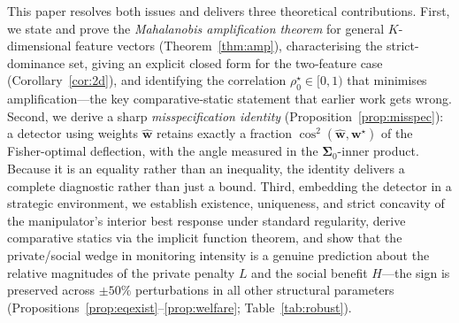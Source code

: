 \documentclass[11pt,a4paper]{article}
\theoremstyle{definition}
\theoremstyle{remark}
\newcommand{\1}{\mathbf{1}}
\newcommand{\w}{\mathbf{w}}
\newcommand{\Sig}{\boldsymbol{\Sigma}}
\begin{document}
This paper resolves both issues and delivers three theoretical contributions. First, we state and prove the \emph{Mahalanobis amplification theorem} for general $K$-dimensional feature vectors (Theorem~\ref{thm:amp}), characterising the strict-dominance set, giving an explicit closed form for the two-feature case (Corollary~\ref{cor:2d}), and identifying the correlation $\rho_0^\star\in[0,1)$ that minimises amplification---the key comparative-static statement that earlier work gets wrong. Second, we derive a sharp \emph{misspecification identity} (Proposition~\ref{prop:misspec}): a detector using weights $\widehat{\w}$ retains exactly a fraction $\cos^2(\widehat{\w},\w^\star)$ of the Fisher-optimal deflection, with the angle measured in the $\Sig_0$-inner product. Because it is an equality rather than an inequality, the identity delivers a complete diagnostic rather than just a bound. Third, embedding the detector in a strategic environment, we establish existence, uniqueness, and strict concavity of the manipulator's interior best response under standard regularity, derive comparative statics via the implicit function theorem, and show that the private/social wedge in monitoring intensity is a genuine prediction about the relative magnitudes of the private penalty $L$ and the social benefit $H$---the sign is preserved across $\pm 50\%$ perturbations in all other structural parameters (Propositions~\ref{prop:eqexist}--\ref{prop:welfare}; Table~\ref{tab:robust}).
\end{document}

